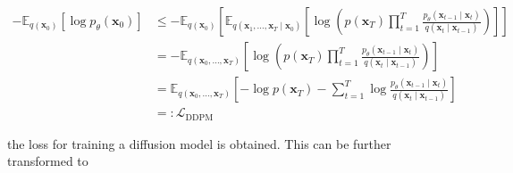 \begin{align}
    - \mathbb{E}_{q(\mathbf{x}_0)} \left[ \log p_\theta(\mathbf{x}_0) \right]  
     &\leq  - \mathbb{E}_{q(\mathbf{x}_0)} \left[ \mathbb{E}_{q(\mathbf{x}_1,\dots,\mathbf{x}_T \mid \mathbf{x}_0)} \left[ \log \left( p(\mathbf{x}_T) \prod_{t=1}^T \frac{p_\theta(\mathbf{x}_{t-1} \mid \mathbf{x}_t)}{q(\mathbf{x}_t \mid \mathbf{x}_{t-1})} \right) \right] \right] \\
    & =  - \mathbb{E}_{q(\mathbf{x}_0,\dots,\mathbf{x}_T)} \left[ \log \left( p(\mathbf{x}_T) \prod_{t=1}^T \frac{p_\theta(\mathbf{x}_{t-1} \mid \mathbf{x}_t)}{q(\mathbf{x}_t \mid \mathbf{x}_{t-1})} \right) \right] \\
    & =   \mathbb{E}_{q(\mathbf{x}_0,\dots,\mathbf{x}_T)} \left[ -\log p(\mathbf{x}_T) - \sum_{t=1}^T \log \frac{p_\theta(\mathbf{x}_{t-1} \mid \mathbf{x}_t)}{q(\mathbf{x}_t \mid \mathbf{x}_{t-1})} \right] \\
    & =: \mathcal{L}_{\text{DDPM}}
\end{align}

the loss for training a diffusion model is obtained. This can be further transformed to



